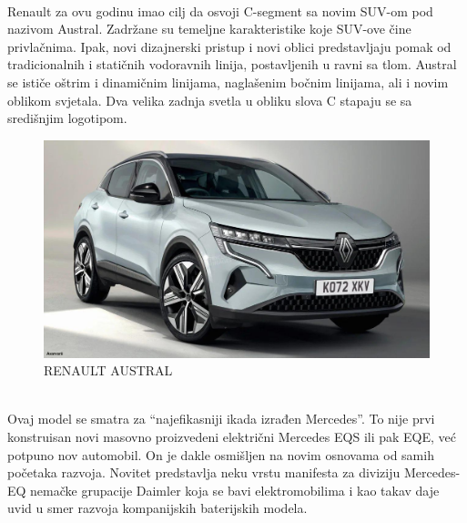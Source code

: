 \documentclass[a4paper]{article}
\begin{document}
\newpage
{}
\\

    Renault za ovu godinu imao cilj da osvoji C-segment sa novim SUV-om pod nazivom Austral. Zadržane su temeljne karakteristike koje SUV-ove čine privlačnima. Ipak, novi dizajnerski pristup i novi oblici predstavljaju pomak od tradicionalnih i statičnih vodoravnih linija, postavljenih u ravni sa tlom. Austral se ističe oštrim i dinamičnim linijama, naglašenim bočnim linijama, ali i novim oblikom svjetala. Dva velika zadnja svetla u obliku slova C stapaju se sa središnjim logotipom.\\  

\begin{figure}[h]
        \centering
        \includegraphics[width=\linewidth]{Austral.jpg}
        \caption{RENAULT AUSTRAL}
        \label{fig:my_label2}
        \end{figure}

\newpage

\\

    Ovaj model se smatra za  “najefikasniji ikada izrađen Mercedes”. To nije prvi konstruisan novi masovno proizvedeni električni Mercedes EQS ili pak EQE, već potpuno nov automobil. On je dakle osmišljen na novim osnovama od samih početaka razvoja. Novitet predstavlja neku vrstu manifesta za diviziju Mercedes-EQ nemačke grupacije Daimler koja se bavi elektromobilima i kao takav daje uvid u smer razvoja kompanijskih baterijskih modela.\\ 
 
\end{document}
